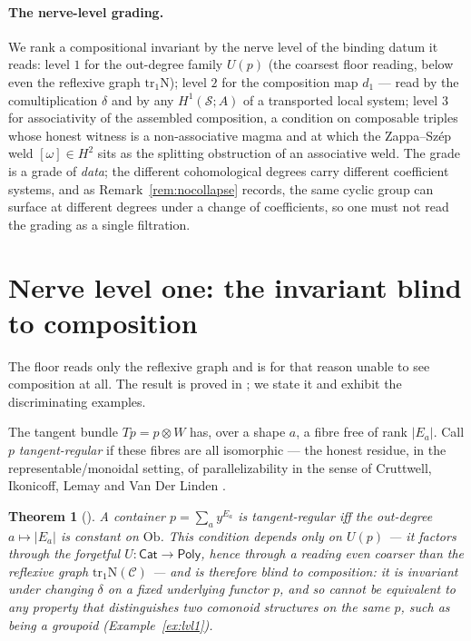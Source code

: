 \documentclass[11pt]{article}
\newtheorem{theorem}{Theorem}
\theoremstyle{definition}
\newcommand{\Poly}{\mathsf{Poly}}
\newcommand{\Cat}{\mathsf{Cat}}
\newcommand{\Ob}{\mathrm{Ob}}
\newcommand{\tr}{\mathrm{tr}}
\newcommand{\sS}{\mathcal{S}}
\newcommand{\cC}{\mathcal{C}}
\newcommand{\Nerve}{\mathrm{N}}
\begin{document}
\paragraph{The nerve-level grading.}
We rank a compositional invariant by the nerve level of the binding datum it reads: level $1$ for the
out-degree family $U(p)$ (the coarsest floor reading, below even the reflexive graph $\tr_1\Nerve$);
level $2$ for the composition map $d_1$ --- read by the comultiplication $\delta$ and by any
$H^1(\sS;A)$ of a transported local system; level $3$ for associativity of the assembled composition,
a condition on composable triples whose honest witness is a non-associative magma and at which the
Zappa--Sz\'ep weld $[\omega]\in H^2$ sits as the splitting obstruction of an associative weld. The grade
is a grade of \emph{data}; the different cohomological degrees carry different coefficient systems, and
as Remark~\ref{rem:nocollapse} records, the same cyclic group can surface at different degrees under a
change of coefficients, so one must not read the grading as a single filtration.

\section{Nerve level one: the invariant blind to composition}\label{sec:lvl1}

The floor reads only the reflexive graph and is for that reason unable to see composition at all. The
result is proved in \cite{MacBethParallel}; we state it and exhibit the discriminating examples.

The tangent bundle $T p=p\otimes W$ has, over a shape $a$, a fibre free of rank $|E_a|$. Call $p$
\emph{tangent-regular} if these fibres are all isomorphic --- the honest residue, in the
representable/monoidal setting, of parallelizability in the sense of Cruttwell, Ikonicoff, Lemay and
Van Der Linden \cite[Def.~4.18, attributed there]{Lanfranchi2026}.

\begin{theorem}[\cite{MacBethParallel}]\label{thm:lvl1}
A container $p=\sum_a y^{E_a}$ is tangent-regular iff the out-degree $a\mapsto|E_a|$ is constant on
$\Ob$. This condition depends only on $U(p)$ --- it factors through the forgetful
$U\colon\Cat\to\Poly$, hence through a reading even coarser than the reflexive graph
$\tr_1\Nerve(\cC)$ --- and is therefore blind to composition: it is invariant under changing
$\delta$ on a fixed underlying functor $p$, and so cannot be equivalent to any property that
distinguishes two comonoid structures on the same $p$, such as being a groupoid
(Example~\ref{ex:lvl1}).
\end{theorem}
\end{document}
